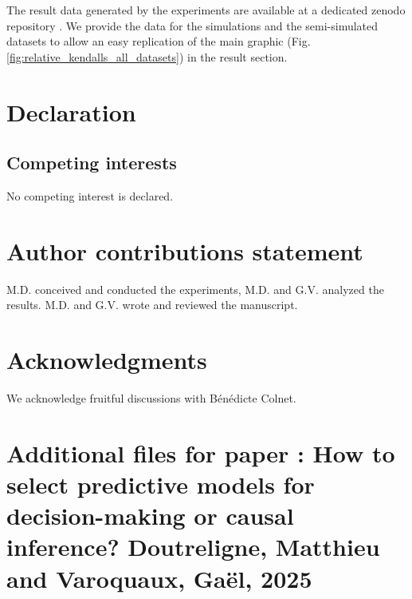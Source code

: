 \documentclass[a4paper,num-refs]{oup-contemporary}%
\begin{document}
The result data generated by the experiments are available at a dedicated zenodo repository \cite{doutreligne2024how}. We provide the data for the simulations and the semi-simulated datasets to allow an easy replication of the main graphic (Fig. \ref{fig:relative_kendalls_all_datasets}) in the result section.

\section{Declaration}
\subsection{Competing interests}
No competing interest is declared.

\section{Author contributions statement}

M.D. conceived and conducted the experiments, M.D. and G.V. analyzed the results. M.D. and G.V. wrote and reviewed the manuscript.

\section{Acknowledgments}

We acknowledge fruitful discussions with Bénédicte Colnet.

\clearpage

\onecolumn
\setcounter{secnumdepth}{2}

\newpage
\setcounter{page}{1}
\appendix
\section{Additional files for paper : How to select predictive models for decision-making or causal inference? Doutreligne, Matthieu and Varoquaux, Gaël, 2025}




\end{document}
